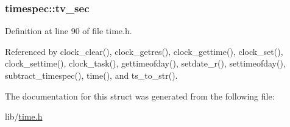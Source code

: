 \subsubsection[{\texorpdfstring{tv\+\_\+sec}{tv_sec}}]{ timespec\+::tv\+\_\+sec}\hypertarget{structtimespec_afc3302668d7cb5952f590da69fdd4955}{}\label{structtimespec_afc3302668d7cb5952f590da69fdd4955}


Definition at line 90 of file time.\+h.



Referenced by clock\+\_\+clear(), clock\+\_\+getres(), clock\+\_\+gettime(), clock\+\_\+set(), clock\+\_\+settime(), clock\+\_\+task(), gettimeofday(), setdate\+\_\+r(), settimeofday(), subtract\+\_\+timespec(), time(), and ts\+\_\+to\+\_\+str().



The documentation for this struct was generated from the following file\+:\begin{DoxyCompactItemize}
\item 
lib/\hyperlink{time_8h}{time.\+h}\end{DoxyCompactItemize}

